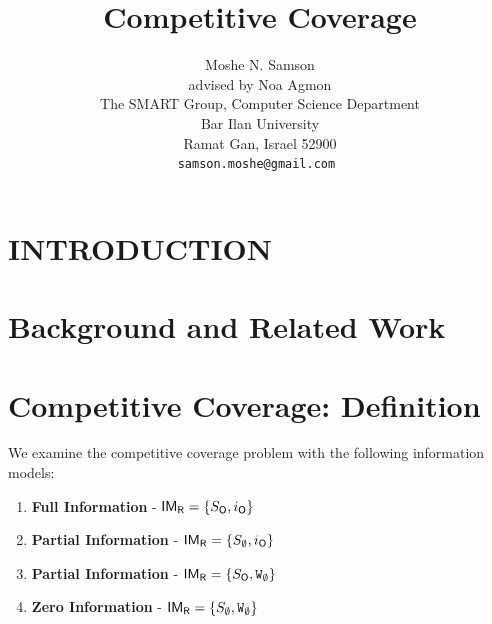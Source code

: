 \documentclass[a4paper,11pt]{article}
\theoremstyle{definition}
\newcommand{\rob}{{{\sf R}}\xspace}
\newcommand{\opp}{{{\sf O}}\xspace}
\newcommand{\w}{{{\texttt W}}\xspace}
\newcommand{\fcc}{{{\sf{FCC}}}\xspace}
\newcommand{\IM}{{{\sf{IM}}}\xspace}
\begin{document}
\title{Competitive Coverage}
\author{Moshe N. Samson\\
advised by Noa Agmon\\
The SMART Group, Computer Science Department\\
Bar Ilan University\\
Ramat Gan, Israel 52900\\
\tt\small samson.moshe@gmail.com
}



\tableofcontents
\maketitle

\begin{abstract}

\end{abstract}

\section{INTRODUCTION}


\section{Background and Related Work}


\section{Competitive Coverage: Definition}


We examine the competitive coverage problem with %
the following information models:%
\begin{enumerate}
\item \textbf{Full Information} - $\IM_{\rob}=\lbrace S_{\opp},i_{\opp}\rbrace$
\item \textbf{Partial Information} - $\IM_{\rob}=\lbrace S_{\emptyset},i_{\opp}\rbrace$
\item \textbf{Partial Information} - $\IM_{\rob}=\lbrace S_{\opp},\w_{\emptyset}\rbrace$
\item \textbf{Zero Information} - $\IM_{\rob}=\lbrace S_{\emptyset},\w_{\emptyset}\rbrace$
\end{enumerate}
\end{document}
